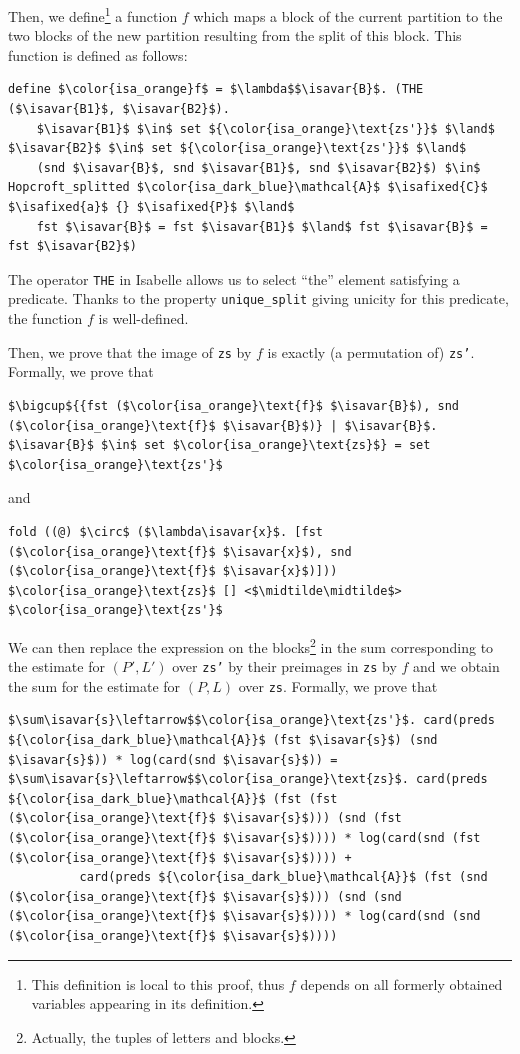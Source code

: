 \documentclass[12pt, a4 paper]{article}
\newcommand{\midtilde}{\raisebox{0.5ex}{\texttildelow}}
\newcommand{\isavar}[1]{{\color{isa_dark_green}\text{#1}}}
\newcommand{\isafixed}[1]{{\color{isa_dark_blue}\text{#1}}}
\theoremstyle{definition}
\begin{document}
Then, we define\footnote{This definition is local to this proof, thus $f$ depends on all formerly obtained variables appearing in its definition.} a function $f$ which maps a block of the current partition to the two blocks of the new partition resulting from the split of this block. This function is defined as follows:

\begin{lstlisting}[language=Isabelle]
define $\color{isa_orange}f$ = $\lambda$$\isavar{B}$. (THE ($\isavar{B1}$, $\isavar{B2}$).
    $\isavar{B1}$ $\in$ set ${\color{isa_orange}\text{zs'}}$ $\land$ $\isavar{B2}$ $\in$ set ${\color{isa_orange}\text{zs'}}$ $\land$
    (snd $\isavar{B}$, snd $\isavar{B1}$, snd $\isavar{B2}$) $\in$ Hopcroft_splitted $\color{isa_dark_blue}\mathcal{A}$ $\isafixed{C}$ $\isafixed{a}$ {} $\isafixed{P}$ $\land$
    fst $\isavar{B}$ = fst $\isavar{B1}$ $\land$ fst $\isavar{B}$ = fst $\isavar{B2}$)
\end{lstlisting}
The operator {\color{isa_blue}\texttt{THE}} in Isabelle allows us to select ``the'' element satisfying a predicate. Thanks to the property \texttt{unique\_split} giving unicity for this predicate, the function $f$ is well-defined.

Then, we prove that the image of \texttt{zs} by $f$ is exactly (a permutation of) \texttt{zs'}. Formally, we prove that
\begin{lstlisting}[language=Isabelle]
$\bigcup${{fst ($\color{isa_orange}\text{f}$ $\isavar{B}$), snd ($\color{isa_orange}\text{f}$ $\isavar{B}$)} | $\isavar{B}$. $\isavar{B}$ $\in$ set $\color{isa_orange}\text{zs}$} = set $\color{isa_orange}\text{zs'}$
\end{lstlisting}
and
\begin{lstlisting}[language=Isabelle]
fold ((@) $\circ$ ($\lambda\isavar{x}$. [fst ($\color{isa_orange}\text{f}$ $\isavar{x}$), snd ($\color{isa_orange}\text{f}$ $\isavar{x}$)])) $\color{isa_orange}\text{zs}$ [] <$\midtilde\midtilde$> $\color{isa_orange}\text{zs'}$
\end{lstlisting}

\bigskip

We can then replace the expression on the blocks\footnote{Actually, the tuples of letters and blocks.} in the sum corresponding to the estimate for $(P', L')$ over \texttt{zs'} by their preimages in \texttt{zs} by $f$ and we obtain the sum for the estimate for $(P, L)$ over \texttt{zs}.
Formally, we prove that
\begin{lstlisting}[language=Isabelle]
$\sum\isavar{s}\leftarrow$$\color{isa_orange}\text{zs'}$. card(preds ${\color{isa_dark_blue}\mathcal{A}}$ (fst $\isavar{s}$) (snd $\isavar{s}$)) * log(card(snd $\isavar{s}$)) =
$\sum\isavar{s}\leftarrow$$\color{isa_orange}\text{zs}$. card(preds ${\color{isa_dark_blue}\mathcal{A}}$ (fst (fst ($\color{isa_orange}\text{f}$ $\isavar{s}$))) (snd (fst ($\color{isa_orange}\text{f}$ $\isavar{s}$)))) * log(card(snd (fst ($\color{isa_orange}\text{f}$ $\isavar{s}$)))) +
          card(preds ${\color{isa_dark_blue}\mathcal{A}}$ (fst (snd ($\color{isa_orange}\text{f}$ $\isavar{s}$))) (snd (snd ($\color{isa_orange}\text{f}$ $\isavar{s}$)))) * log(card(snd (snd ($\color{isa_orange}\text{f}$ $\isavar{s}$))))
\end{lstlisting}
\end{document}

